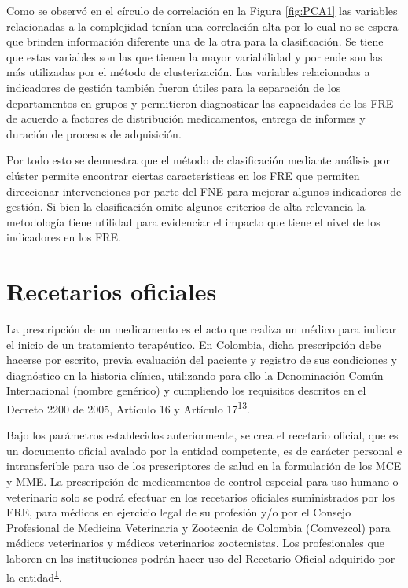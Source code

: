 \documentclass[
]{book}
\begin{document}
Como se observó en el círculo de correlación en la Figura \ref{fig:PCA1} las variables relacionadas a la complejidad tenían una correlación alta por lo cual no se espera que brinden información diferente una de la otra para la clasificación. Se tiene que estas variables son las que tienen la mayor variabilidad y por ende son las más utilizadas por el método de clusterización. Las variables relacionadas a indicadores de gestión también fueron útiles para la separación de los departamentos en grupos y permitieron diagnosticar las capacidades de los FRE de acuerdo a factores de distribución medicamentos, entrega de informes y duración de procesos de adquisición.

Por todo esto se demuestra que el método de clasificación mediante análisis por clúster permite encontrar ciertas características en los FRE que permiten direccionar intervenciones por parte del FNE para mejorar algunos indicadores de gestión. Si bien la clasificación omite algunos criterios de alta relevancia la metodología tiene utilidad para evidenciar el impacto que tiene el nivel de los indicadores en los FRE.

\hypertarget{recetarios-oficiales}{%
\chapter{Recetarios oficiales}\label{recetarios-oficiales}}


La prescripción de un medicamento es el acto que realiza un médico para indicar el inicio de un tratamiento terapéutico. En Colombia, dicha prescripción debe hacerse por escrito, previa evaluación del paciente y registro de sus condiciones y diagnóstico en la historia clínica, utilizando para ello la Denominación Común Internacional (nombre genérico) y cumpliendo los requisitos descritos en el Decreto 2200 de 2005, Artículo 16 y Artículo 17\textsuperscript{\protect\hyperlink{ref-MSPS2200-2005}{13}}.

Bajo los parámetros establecidos anteriormente, se crea el recetario oficial, que es un documento oficial avalado por la entidad competente, es de carácter personal e intransferible para uso de los prescriptores de salud en la formulación de los MCE y MME. La prescripción de medicamentos de control especial para uso humano o veterinario solo se podrá efectuar en los recetarios oficiales suministrados por los FRE, para médicos en ejercicio legal de su profesión y/o por el Consejo Profesional de Medicina Veterinaria y Zootecnia de Colombia (Comvezcol) para médicos veterinarios y médicos veterinarios zootecnistas. Los profesionales que laboren en las instituciones podrán hacer uso del Recetario Oficial adquirido por la entidad\textsuperscript{\protect\hyperlink{ref-MSPS1478-2006}{1}}.
\end{document}
